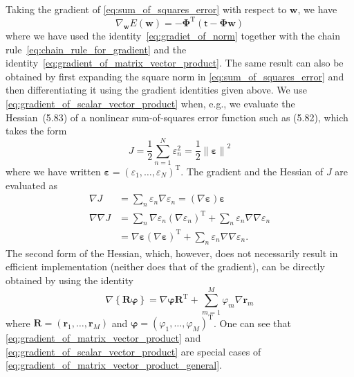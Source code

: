 \documentclass[12pt,a4paper]{article}
\begin{document}
Taking the gradient of \eqref{eq:sum_of_squares_error} with respect to $\mathbf{w}$, we have
\begin{equation}
\nabla_{\mathbf{w}} E(\mathbf{w}) =
-\bm{\Phi}^{\operatorname{T}} \left( \bm{\mathsf{t}} - \bm{\Phi}\mathbf{w} \right)
\end{equation}
where we have used the identity~\eqref{eq:gradiet_of_norm} together with
the chain rule~\eqref{eq:chain_rule_for_gradient} and
the identity~\eqref{eq:gradient_of_matrix_vector_product}.
The same result can also be obtained by first expanding the square norm in
\eqref{eq:sum_of_squares_error} and then differentiating it using the gradient identities
given above.
We use \eqref{eq:gradient_of_scalar_vector_product}
when, e.g., we evaluate the Hessian~(5.83) of a nonlinear sum-of-squares error function
such as (5.82), which takes the form
\begin{equation}
J = \frac{1}{2} \sum_{n=1}^{N} \varepsilon_n^{2} = \frac{1}{2} \left\|\bm{\varepsilon}\right\|^2
\end{equation}
where we have written
$\bm{\varepsilon} = \left(\varepsilon_1, \dots, \varepsilon_N\right)^{\operatorname{T}}$.
The gradient and the Hessian of $J$ are evaluated as
\begin{align}
\nabla J &= \sum_{n} \varepsilon_n \nabla \varepsilon_n
= \left( \nabla \bm{\varepsilon} \right) \bm{\varepsilon} \\
\nabla\nabla J &= \sum_{n} \nabla\varepsilon_n \left(\nabla\varepsilon_n\right)^{\operatorname{T}}
+ \sum_{n} \varepsilon_n \nabla\nabla \varepsilon_n \\
&= \nabla \bm{\varepsilon} \left( \nabla \bm{\varepsilon} \right)^{\operatorname{T}}
+ \sum_{n} \varepsilon_n \nabla\nabla \varepsilon_n .
\end{align}
The second form of the Hessian,
which, however, does not necessarily result in efficient implementation
(neither does that of the gradient),
can be directly obtained by using the identity
\begin{equation}
\nabla \left\{ \mathbf{R} \bm{\varphi} \right\}
= \nabla \bm{\varphi} \mathbf{R}^{\operatorname{T}} + \sum_{m=1}^{M} \varphi_m \nabla \mathbf{r}_m
\label{eq:gradient_of_matrix_vector_product_general}
\end{equation}
where $\mathbf{R} = \left(\mathbf{r}_1, \dots, \mathbf{r}_M\right)$ and
$\bm{\varphi} = \left(\varphi_1, \dots, \varphi_M\right)^{\operatorname{T}}$.
One can see that
\eqref{eq:gradient_of_matrix_vector_product} and
\eqref{eq:gradient_of_scalar_vector_product}
are special cases of
\eqref{eq:gradient_of_matrix_vector_product_general}.
\end{document}
